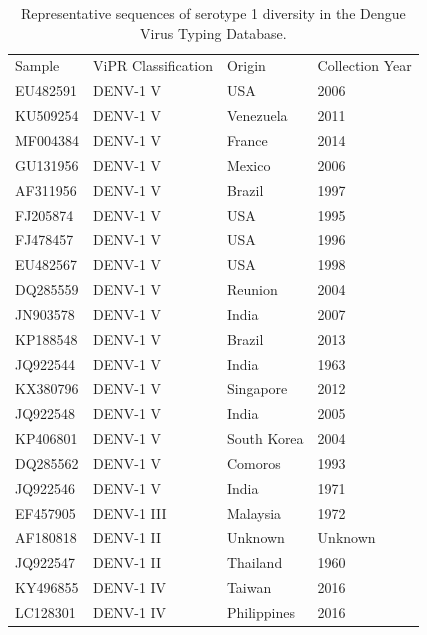 \begin{longtable}{@{}llll@{}}
\caption{Representative sequences of serotype 1 diversity in the Dengue Virus Typing Database.}
\label{tab:chap4_s7}\\
Sample   & ViPR Classification & Origin      & Collection Year \\
EU482591 & DENV-1 V            & USA         & 2006            \\
KU509254 & DENV-1 V            & Venezuela   & 2011            \\
MF004384 & DENV-1 V            & France      & 2014            \\
GU131956 & DENV-1 V            & Mexico      & 2006            \\
AF311956 & DENV-1 V            & Brazil      & 1997            \\
FJ205874 & DENV-1 V            & USA         & 1995            \\
FJ478457 & DENV-1 V            & USA         & 1996            \\
EU482567 & DENV-1 V            & USA         & 1998            \\
DQ285559 & DENV-1 V            & Reunion     & 2004            \\
JN903578 & DENV-1 V            & India       & 2007            \\
KP188548 & DENV-1 V            & Brazil      & 2013            \\
JQ922544 & DENV-1 V            & India       & 1963            \\
KX380796 & DENV-1 V            & Singapore   & 2012            \\
JQ922548 & DENV-1 V            & India       & 2005            \\
KP406801 & DENV-1 V            & South Korea & 2004            \\
DQ285562 & DENV-1 V            & Comoros     & 1993            \\
JQ922546 & DENV-1 V            & India       & 1971            \\
EF457905 & DENV-1 III          & Malaysia    & 1972            \\
AF180818 & DENV-1 II           & Unknown     & Unknown         \\
JQ922547 & DENV-1 II           & Thailand    & 1960            \\
KY496855 & DENV-1 IV           & Taiwan      & 2016            \\
LC128301 & DENV-1 IV           & Philippines & 2016            \\

\end{longtable}
